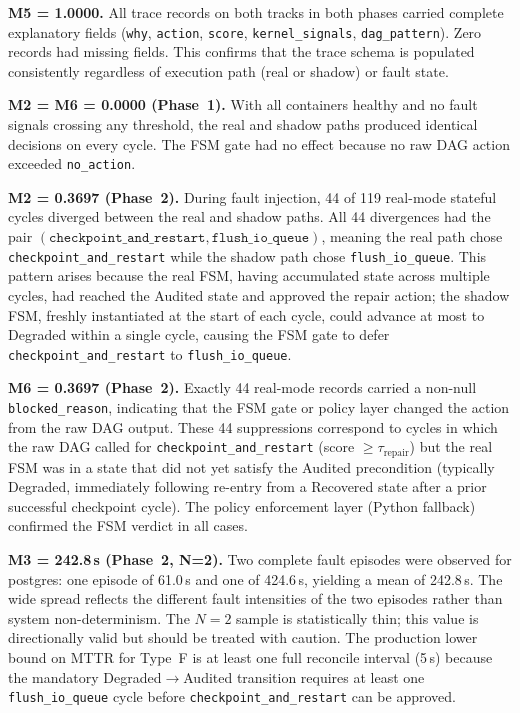 \documentclass[runningheads]{llncs}
\begin{document}
\textbf{M5 = 1.0000.} All trace records on both tracks in both phases
carried complete explanatory fields (\texttt{why}, \texttt{action},
\texttt{score}, \texttt{kernel\_signals}, \texttt{dag\_pattern}). Zero
records had missing fields. This confirms that the trace schema is
populated consistently regardless of execution path (real or shadow)
or fault state.

\textbf{M2 = M6 = 0.0000 (Phase~1).} With all containers healthy and
no fault signals crossing any threshold, the real and shadow paths
produced identical decisions on every cycle. The FSM gate had no effect
because no raw DAG action exceeded \texttt{no\_action}.

\textbf{M2 = 0.3697 (Phase~2).} During fault injection, 44 of 119
real-mode stateful cycles diverged between the real and shadow paths.
All 44 divergences had the pair $(\texttt{checkpoint\_and\_restart},
\texttt{flush\_io\_queue})$, meaning the real path chose
\texttt{checkpoint\_and\_restart} while the shadow path chose
\texttt{flush\_io\_queue}. This pattern arises because the real FSM,
having accumulated state across multiple cycles, had reached the Audited
state and approved the repair action; the shadow FSM, freshly
instantiated at the start of each cycle, could advance at most to
Degraded within a single cycle, causing the FSM gate to defer
\texttt{checkpoint\_and\_restart} to \texttt{flush\_io\_queue}.

\textbf{M6 = 0.3697 (Phase~2).} Exactly 44 real-mode records carried a
non-null \texttt{blocked\_reason}, indicating that the FSM gate or
policy layer changed the action from the raw DAG output. These 44
suppressions correspond to cycles in which the raw DAG called for
\texttt{checkpoint\_and\_restart} (score $\geq \tau_{\mathrm{repair}}$)
but the real FSM was in a state that did not yet satisfy the Audited
precondition (typically Degraded, immediately following re-entry from
a Recovered state after a prior successful checkpoint cycle). The
policy enforcement layer (Python fallback) confirmed the FSM verdict
in all cases.

\textbf{M3 = 242.8\,s (Phase~2, N=2).} Two complete fault episodes
were observed for postgres: one episode of 61.0\,s and one of 424.6\,s,
yielding a mean of 242.8\,s. The wide spread reflects the different
fault intensities of the two episodes rather than system non-determinism.
The $N=2$ sample is statistically thin; this value is directionally
valid but should be treated with caution. The production lower bound on
MTTR for Type~F is at least one full reconcile interval (5\,s) because
the mandatory Degraded$\to$Audited transition requires at least one
\texttt{flush\_io\_queue} cycle before \texttt{checkpoint\_and\_restart}
can be approved.
\end{document}
